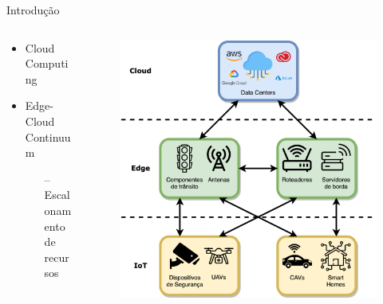 \begin{frame}{Introdução}
    \begin{columns}[T]
        \begin{column}{.5\textwidth}
            \begin{itemize}
                \item Cloud Computing
                \item Edge-Cloud Continuum
                \begin{itemize}
                    \item[--] Escalonamento de recursos
                \end{itemize}
            \end{itemize}
        \end{column}

        \begin{column}{.5\textwidth}
            \begin{figure}
                \centering
                \includegraphics[width=\textwidth]{Figuras/TCC Edge Cloud IoT.png}
            \end{figure}
        \end{column}
    \end{columns}
\end{frame}

